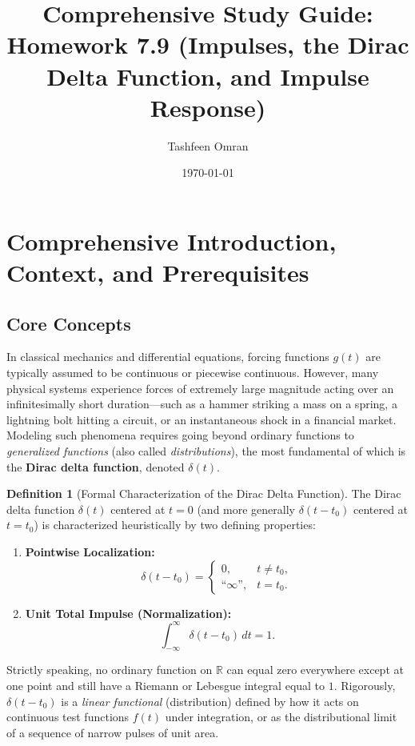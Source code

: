 \documentclass[11pt, letterpaper]{article}
\title{Comprehensive Study Guide: Homework 7.9 (Impulses, the Dirac Delta Function, and Impulse Response)}
\author{Tashfeen Omran}
\date{\today}
\theoremstyle{definition}
\newtheorem{definition}{Definition}[section]
\theoremstyle{remark}
\newcommand{\R}{\mathbb{R}}
\begin{document}
\maketitle
\tableofcontents
\newpage

\section{Comprehensive Introduction, Context, and Prerequisites}

\subsection{Core Concepts}
In classical mechanics and differential equations, forcing functions $g(t)$ are typically assumed to be continuous or piecewise continuous. However, many physical systems experience forces of extremely large magnitude acting over an infinitesimally short duration—such as a hammer striking a mass on a spring, a lightning bolt hitting a circuit, or an instantaneous shock in a financial market. Modeling such phenomena requires going beyond ordinary functions to \emph{generalized functions} (also called \emph{distributions}), the most fundamental of which is the \textbf{Dirac delta function}, denoted $\delta(t)$.

\begin{definition}[Formal Characterization of the Dirac Delta Function]
The Dirac delta function $\delta(t)$ centered at $t = 0$ (and more generally $\delta(t - t_0)$ centered at $t = t_0$) is characterized heuristically by two defining properties:
\begin{enumerate}
    \item \textbf{Pointwise Localization:}
    \[
        \delta(t - t_0) = \begin{cases} 0, & t \neq t_0, \\ \text{``}\infty\text{''}, & t = t_0. \end{cases}
    \]
    \item \textbf{Unit Total Impulse (Normalization):}
    \[
        \int_{-\infty}^{\infty} \delta(t - t_0)\,dt = 1.
    \]
\end{enumerate}
\end{definition}

Strictly speaking, no ordinary function on $\R$ can equal zero everywhere except at one point and still have a Riemann or Lebesgue integral equal to $1$. Rigorously, $\delta(t - t_0)$ is a \emph{linear functional} (distribution) defined by how it acts on continuous test functions $f(t)$ under integration, or as the distributional limit of a sequence of narrow pulses of unit area.
\end{document}
